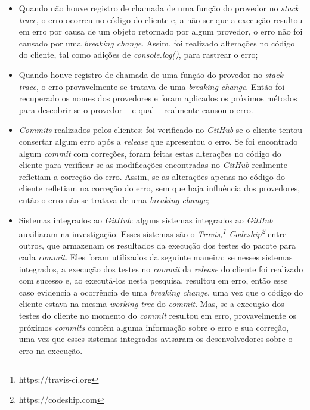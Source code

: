 \begin{itemize}
    \item Quando não houve registro de chamada de uma função do provedor no \textit{stack trace}, o erro ocorreu no código do cliente e, a não ser que a execução resultou em erro por causa de um objeto retornado por algum provedor, o erro não foi causado por uma \textit{breaking change}. Assim, foi realizado alterações no código do cliente, tal como adições de \textit{console.log()}, para rastrear o erro;
    \item Quando houve registro de chamada de uma função do provedor no \textit{stack trace}, o erro provavelmente se tratava de uma \textit{breaking change}. Então foi recuperado os nomes dos provedores e foram aplicados os próximos métodos para descobrir se o provedor -- e qual -- realmente causou o erro.

    \item \textit{Commits} realizados pelos clientes: foi verificado no \textit{GitHub} se o cliente tentou consertar algum erro após a \textit{release} que apresentou o erro. Se foi encontrado algum \textit{commit} com correções, foram feitas estas alterações no código do cliente para verificar se as modificações encontradas no \textit{GitHub} realmente refletiam a correção do erro. Assim, se as alterações apenas no código do cliente refletiam na correção do erro, sem que haja influência dos provedores, então o erro não se tratava de uma \textit{breaking change};

    \item Sistemas integrados ao \textit{GitHub}: alguns sistemas integrados ao \textit{GitHub} auxiliaram na investigação. Esses sistemas são o \textit{Travis,\footnote{https://travis-ci.org} Codeship\footnote{https://codeship.com}} entre outros, que armazenam os resultados da execução dos testes do pacote para cada \textit{commit}. Eles foram utilizados da seguinte maneira: se nesses sistemas integrados, a execução dos testes no \textit{commit} da \textit{release} do cliente foi realizado com sucesso e, ao executá-los nesta pesquisa, resultou em erro, então esse caso evidencia a ocorrência de uma \textit{breaking change}, uma vez que o código do cliente estava na mesma \textit{working tree} do \textit{commit}. Mas, se a execução dos testes do cliente no momento do \textit{commit} resultou em erro, provavelmente os próximos \textit{commits} contêm alguma informação sobre o erro e sua correção, uma vez que esses sistemas integrados avisaram os desenvolvedores sobre o erro na execução.
    

\end{itemize}
